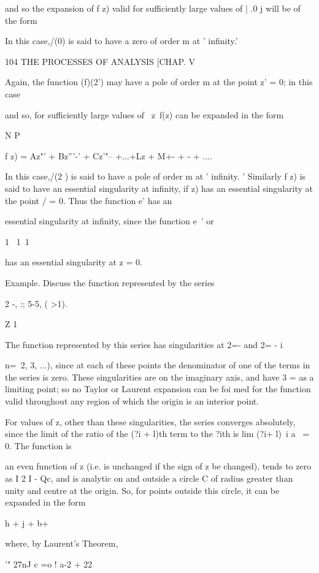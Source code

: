 {{{{and so the expansion of f z) valid for sufficiently large values of |
.0 j will be of the form

In this case,/(0) is said to have a zero of order m at ' infinity.'

104 THE PROCESSES OF ANALYSIS [CHAP. V

Again, the function (f)(2') may have a pole of order m at the point z'
= 0; in this case

and so, for sufficiently large values of \ z\, f(z) can be expanded in
the form

N P

f z) = Az"' + Bz'''-' + Cz'"-- +...+Lz + M+- + - + ....

In this case,/(2 ) is said to have a pole of order m at ' infinity. '
Similarly f z) is said to have an essential singularity at infinity,
if z) has an essential singularity at the point / = 0. Thus the
function e' has an

essential singularity at infinity, since the function e~' or

1 \ 1\ 1

has an essential singularity at z = 0.

Example. Discuss the function represented by the series

2 -, :; 5-5, ( >1).

Z 1

The function represented by this series has singularities at 2=- and
2= - i

 n=\, 2, 3, ...), since at each of these points the denominator of one
of the terms in the series is zero. These singularities are on the
imaginary axis, and have 3 = as a limiting point; so no Taylor or
Laurent expansion can be foi med for the function valid throughout any
region of which the origin is an interior point.

For values of z, other than these singularities, the series converges
absolutely, since the limit of the ratio of the (?i + l)th term to the
?ith is lim (?i+ l)~i a~ = 0. The function is

an even function of z (i.e. is unchanged if the sign of z be changed),
tends to zero as I 2 I - Qc, and is analytic on and outside a circle
C of radius greater than unity and centre at the origin. So, for
points outside this circle, it can be expanded in the form

h + j + b+

where, by Laurent's Theorem,

'" 27nJ c =o ! a-2 + 22

}}}}

